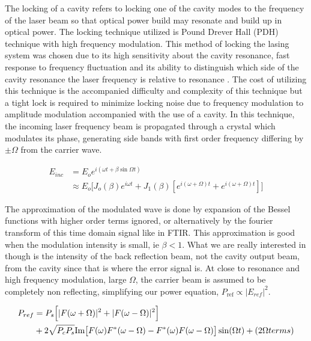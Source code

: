 \documentclass[11pt,a4paper]{book}
\begin{document}
		The locking of a cavity refers to locking one of the cavity modes to the frequency of the laser beam so that optical power build may resonate and build up in optical power.
		The locking technique utilized is Pound Drever Hall (PDH) technique with high frequency modulation. This method of locking the lasing system was chosen due to its high sensitivity about the cavity resonance, fast response to frequency fluctuation and its ability to distinguish which side of the cavity resonance the laser frequency is relative to resonance \cite{PDH Intro}. The cost of utilizing this technique is the accompanied difficulty and complexity of this technique but a tight lock is required to minimize locking noise due to frequency modulation to amplitude modulation accompanied with the use of a cavity. In this technique, the incoming laser frequency beam is propagated through a crystal which modulates its phase, generating side bands with first order frequency differing by $\pm \Omega$ from the carrier wave.
		
		\begin{equation}
			\begin{split}
			E_{inc} & = E_o e^{i(\omega t + \beta\sin{\Omega t})}\\
			& \approx E_o \Big[J_o(\beta) e^{i\omega t} 
			+J_1(\beta)[e^{i(\omega +\Omega)t} +e^{i(\omega + \Omega)t}]\Big]
			\end{split}
		\end{equation}
		
		The approximation of the modulated wave is done by expansion of the Bessel functions with higher order terms ignored, or alternatively by the fourier transform of this time domain signal like in FTIR. This approximation is good when the modulation intensity is small, ie $\beta < 1$. What we are really interested in though is the intensity of the back reflection beam, not the cavity output beam, from the cavity since that is where the error signal is. At close to resonance and high frequency modulation, large $\Omega$, the carrier beam is assumed to be completely non reflecting, simplifying our power equation, $P_{\text{ref}}\propto |E_{ref}|^2$.
		
		\begin{equation}
			\begin{split}
			P_{ref} & = P_s\Big[|F(\omega +\Omega)|^2+|F(\omega -\Omega)|^2\Big]\\
			& + 2\sqrt{P_c P_s} \space \text{Im}  \big[ F(\omega)F^*(\omega - \Omega)-F^*(\omega) F(\omega - \Omega) \big]\sin (\Omega t)+(2\Omega terms)\\
			\end{split}
		\end{equation}
		
\end{document}
